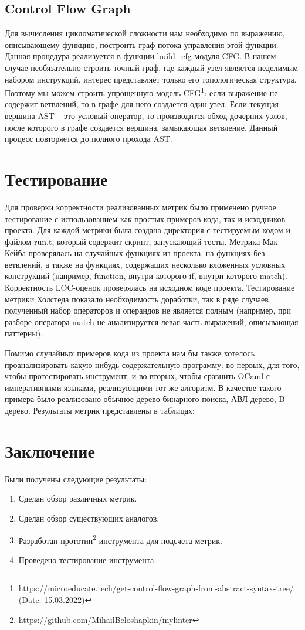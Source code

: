 \subsection{Control Flow Graph}
Для вычисления цикломатической сложности нам необходимо
по выражению, описывающему функцию, построить граф потока
управления этой функции. Данная процедура реализуется в функции build\_cfg модуля CFG. В нашем случае необязательно строить точный граф, где каждый узел является неделимым набором инструкций, интерес представляет только его
топологическая структура. Поэтому мы можем строить
упрощенную модель CFG\footnote{https://microeducate.tech/get-control-flow-graph-from-abstract-syntax-tree/ (Date: 15.03.2022)}: если выражение не содержит ветвлений, то в графе для
него создается один узел. Если текущая вершина AST -- это условый оператор, то производится обход дочерних узлов, после которого в графе создается вершина,
замыкающая ветвление. Данный процесс повторяется до полного прохода AST.
\section{Тестирование}
Для проверки корректности реализованных метрик было применено ручное тестирование
с использованием как простых примеров кода, так и исходников проекта.  Для каждой
метрики была создана директория с тестируемым кодом и файлом run.t, который содержит
скрипт, запускающий тесты. Метрика Мак-Кейба проверялась на случайных функциях из проекта, на функциях без ветвлений, а также на функциях, содержащих несколько вложенных
условных конструкций (например, function, внутри которого if, внутри которого match). 
Корректность LOC-оценок проверялась на исходном коде проекта. Тестирование метрики Холстеда
показало необходимость доработки, так в ряде случаев полученный набор операторов и операндов
не является полным (например, при разборе оператора match не анализируется левая часть выражений, описывающая паттерны).

Помимо случайных примеров кода из проекта нам бы также хотелось проанализировать какую-нибудь
содержательную программу: во первых, для того, чтобы протестировать инструмент, и во-вторых, чтобы
сравнить OCaml с императивными языками, реализующими тот же алгоритм. В качестве такого
примера было реализовано обычное дерево бинарного поиска, АВЛ дерево, B-дерево. Результаты метрик 
представлены в таблицах:

\newpage
\section{Заключение}
Были получены следующие результаты:
\begin{enumerate}
    \item Сделан обзор различных метрик.
    \item Сделан обзор существующих аналогов.
    \item Разработан прототип\footnote{https://github.com/MihailBeloshapkin/mylinter} инструмента для подсчета метрик.
    \item Проведено тестирование инструмента.
\end{enumerate}


